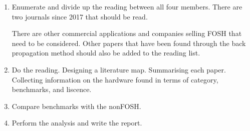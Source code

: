 \documentclass{article}
\begin{document}
\begin{enumerate}
    \item Enumerate and divide up the reading between all four members.
        There are two journals since 2017 that should be read. 

        There are other commercial applications and companies selling FOSH that need to be considered. 
        Other papers that have been found through the back propagation method should also be added to the reading list.
        
    \item Do the reading.
        Designing a literature map. 
        Summarising each paper. 
        Collecting information on the hardware found in terms of category, benchmarks, and liscence. 
    \item Compare benchmarks with the nonFOSH.
    \item Perform the analysis and write the report. 
\end{enumerate}


\nocite{*}
\printbibliography
\end{document}
